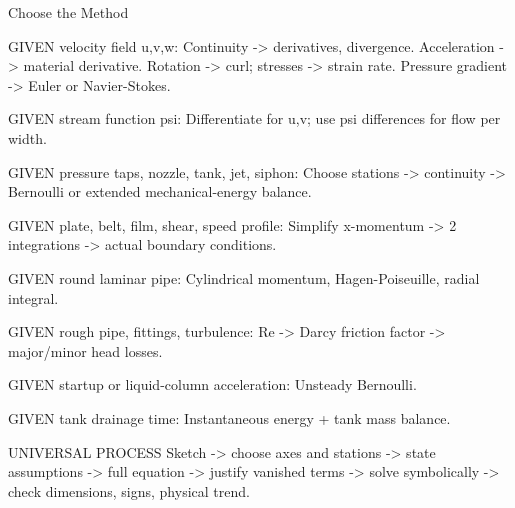 Choose the Method

GIVEN velocity field u,v,w:
Continuity -> derivatives, divergence.
Acceleration -> material derivative.
Rotation -> curl; stresses -> strain rate.
Pressure gradient -> Euler or Navier-Stokes.

GIVEN stream function psi:
Differentiate for u,v; use psi differences for flow per width.

GIVEN pressure taps, nozzle, tank, jet, siphon:
Choose stations -> continuity -> Bernoulli or extended mechanical-energy balance.

GIVEN plate, belt, film, shear, speed profile:
Simplify x-momentum -> 2 integrations -> actual boundary conditions.

GIVEN round laminar pipe:
Cylindrical momentum, Hagen-Poiseuille, radial integral.

GIVEN rough pipe, fittings, turbulence:
Re -> Darcy friction factor -> major/minor head losses.

GIVEN startup or liquid-column acceleration:
Unsteady Bernoulli.

GIVEN tank drainage time:
Instantaneous energy + tank mass balance.

UNIVERSAL PROCESS
Sketch -> choose axes and stations -> state assumptions -> full equation -> justify vanished terms -> solve symbolically -> check dimensions, signs, physical trend.
